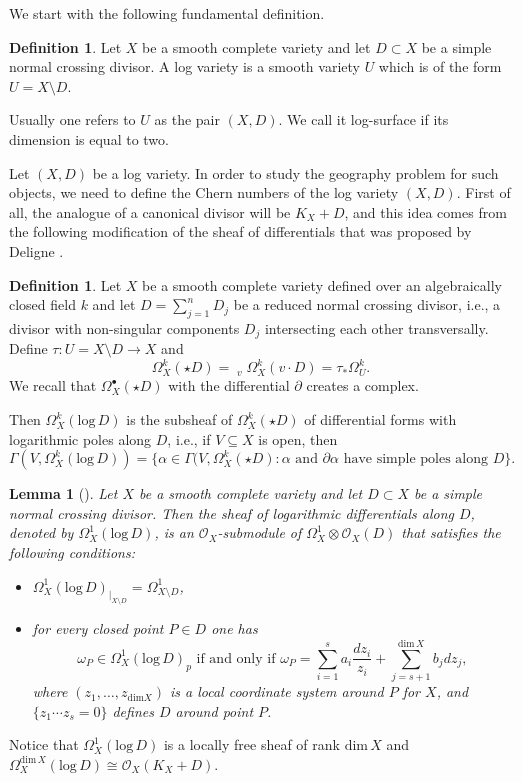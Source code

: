 \documentclass{article}
\theoremstyle{plain}
\newtheorem{lemma}[thm]{Lemma}
\theoremstyle{definition}
\newtheorem{definition}[thm]{Definition}
\numberwithin{equation}{section}
\begin{document}
We start with the following fundamental definition.
\begin{definition}
Let $X$ be a smooth complete variety and let $D \subset X$ be a simple normal crossing divisor. A log variety is a smooth variety $U$ which is of the form $U = X \setminus D$. 
\end{definition}
Usually one refers to $U$ as the pair $(X,D)$. We call it log-surface if its dimension is equal to two. 

Let $(X,D)$ be a log variety. In order to study the geography problem for such objects, we need to define the Chern numbers of the log variety $(X,D)$. First of all, the analogue of a canonical divisor will be $K_{X}+D$, and this idea comes from the following modification of the sheaf of differentials that was proposed by Deligne \cite{Deligne}. 
\begin{definition}
Let $X$ be a smooth complete variety defined over an algebraically closed field $k$ and let $D = \sum_{j=1}^{n}D_{j}$ be a reduced normal crossing divisor, i.e., a divisor with non-singular components $D_{j}$ intersecting each other transversally. Define $\tau : U = X \setminus D \rightarrow X$ and
\[\Omega^{k}_{X}(\star D) = \mathop{\lim_{\longrightarrow}}_{v}\Omega_{X}^{k}(v\cdot D) =  \tau_{*}\Omega^{k}_{U}.\] 
We recall that $\Omega^{\bullet}_{X}(\star D)$ with the differential $\partial$ creates a complex.

Then $\Omega^{k}_{X}(\textrm{log}\,D)$ is the subsheaf of $\Omega_{X}^{k}(\star D)$ of differential forms with logarithmic poles along $D$, i.e., if $V \subseteq X$ is open, then
\[\Gamma(V, \Omega^{k}_{X}(\textrm{log}\,D)) = \{\alpha \in \Gamma(V, \Omega^{k}_{X}(\star D): \alpha \text{ and } \partial\alpha \text{ have simple poles along } D\}.\]
\end{definition}
\begin{lemma}[{\cite[2.2. Properties]{EV}}]
Let $X$ be a smooth complete variety and let $D \subset X$ be a simple normal crossing divisor. Then the sheaf of logarithmic differentials along $D$, denoted by $\Omega_{X}^{1}(\textrm{log} \, D)$, is an $\mathcal{O}_{X}$-submodule of $\Omega_{X}^{1} \otimes \mathcal{O}_{X}(D)$ that satisfies the following conditions:
\begin{itemize}
\item $\Omega_{X}^{1}(\textrm{log} \, D)_{|_{X\setminus D}} = \Omega^{1}_{X\setminus D}$,
\item for every closed point $P \in D$ one has
\[\omega_{P} \in \Omega_{X}^{1}(\textrm{log} \, D)_{p} \text{ if and only if } \omega_{P} = \sum_{i=1}^{s} a_{i}\frac{dz_{i}}{z_{i}} + \sum_{j=s+1}^{\textrm{dim} \,X} b_{j}dz_{j},\]
where $(z_{1}, \ldots, z_{\textrm{dim}X})$ is a local coordinate system around $P$ for $X$, and $\{z_{1} \cdots z_{s} = 0\}$ defines $D$ around point $P$.
\end{itemize}
\end{lemma}
Notice that $\Omega_{X}^{1}(\textrm{log}\,D)$ is a locally free sheaf of rank $\textrm{dim} \, X$ and $\Omega_{X}^{\textrm{dim}\, X}(\textrm{log}\,D) \cong \mathcal{O}_{X}(K_{X}+D)$.
\end{document}
